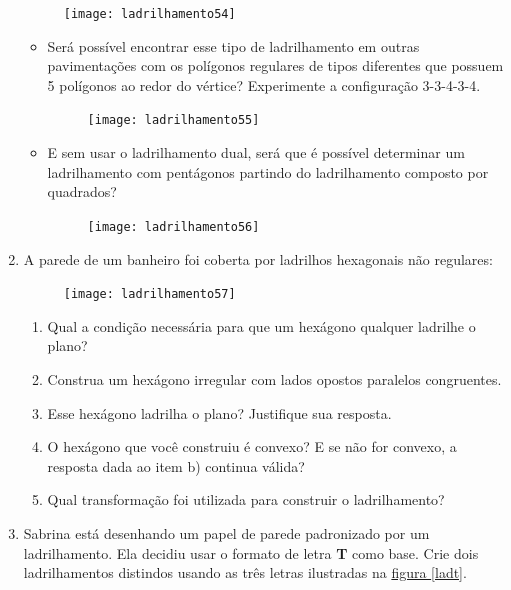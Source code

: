 \begin{enumerate}
\begin{figure}[H]
	\centering
	\texttt{[image: ladrilhamento54]}

\end{figure}

\begin{itemize}


\item Será possível encontrar esse tipo de ladrilhamento em outras pavimentações com os polígonos regulares de tipos diferentes que possuem 5 polígonos ao redor do vértice? 	Experimente a configuração 3-3-4-3-4.

	\begin{figure}[H]
	\centering
	\texttt{[image: ladrilhamento55]}

	\end{figure}

\item 	E sem usar o ladrilhamento dual, será que é possível determinar um ladrilhamento com pentágonos partindo do ladrilhamento composto por quadrados?

	\begin{figure}[H]
	\centering
	\texttt{[image: ladrilhamento56]}

	\end{figure}

\end{itemize}

\item  A parede de um banheiro foi coberta por ladrilhos hexagonais não regulares:

	\begin{figure}[H]
	\centering
	\texttt{[image: ladrilhamento57]}

	\end{figure}
	\begin{enumerate}
		\item Qual a condição necessária para que um hexágono qualquer ladrilhe o plano?
		\item Construa um hexágono irregular com lados opostos paralelos congruentes.
		\item Esse hexágono ladrilha o plano? Justifique sua resposta.
		\item O hexágono que você construiu é convexo? E se não for convexo, a resposta dada ao item b) continua válida?
		\item Qual transformação foi utilizada para construir o ladrilhamento?
	\end{enumerate}
	
	
\item 
Sabrina está desenhando um papel de parede padronizado por um ladrilhamento. Ela decidiu usar o formato de letra \textbf{T} como base. Crie dois ladrilhamentos distindos usando as três letras ilustradas na \hyperref[ladt]{figura \ref{ladt}}.


\end{enumerate}

